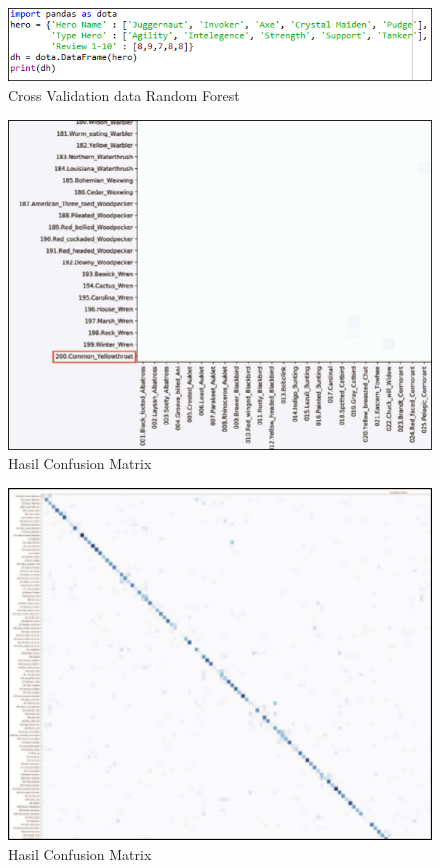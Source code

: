 \begin{figure}
	\centerline{\includegraphics[width=1\textwidth]{figures/fathi/chapter3/hari2/fix.png}}
	\caption{Cross Validation data Random Forest}
	\label{fix}
\end{figure}

\begin{figure}
	\centerline{\includegraphics[width=1\textwidth]{figures/fathi/chapter3/hari2/matrix.png}}
	\caption{Hasil Confusion Matrix}
	\label{matrix}
\end{figure}

\begin{figure}
	\centerline{\includegraphics[width=1\textwidth]{figures/fathi/chapter3/hari2/matrix2.png}}
	\caption{Hasil Confusion Matrix}
	\label{matrix2}
\end{figure}


